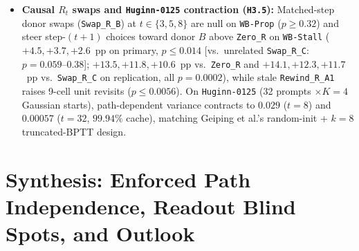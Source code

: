 \documentclass[10pt,letterpaper]{article}
\begin{document}
\begin{itemize}
  \item \textbf{Causal $R_t$ swaps and \texttt{Huginn-0125} contraction (\texttt{H3.5}):} Matched-step donor swaps (\texttt{Swap\_R\_B}) at $t \in \{3,5,8\}$ are null on \texttt{WB-Prop} ($p \ge 0.32$) and steer step-$(t+1)$ choices toward donor $B$ above \texttt{Zero\_R} on \texttt{WB-Stall} ($+4.5, +3.7, +2.6$~pp on primary, $p \le 0.014$ [vs.\ unrelated \texttt{Swap\_R\_C}: $p=0.059\text{--}0.38$]; $+13.5, +11.8, +10.6$~pp vs.\ \texttt{Zero\_R} and $+14.1, +12.3, +11.7$~pp vs.\ \texttt{Swap\_R\_C} on replication, all $p=0.0002$), while stale \texttt{Rewind\_R\_A1} raises 9-cell unit revisits ($p \le 0.0056$). On \texttt{Huginn-0125} (32 prompts $\times K=4$ Gaussian starts), path-dependent variance contracts to $0.029$ ($t=8$) and $\mathbf{0.00057}$ ($t=32$, $99.94\%$ cache), matching Geiping et al.'s \cite{geiping2025huginn} random-init + $k=8$ truncated-BPTT design.
\end{itemize}

\section{Synthesis: Enforced Path Independence, Readout Blind Spots, and Outlook}\label{sec:discussion}
\end{document}
